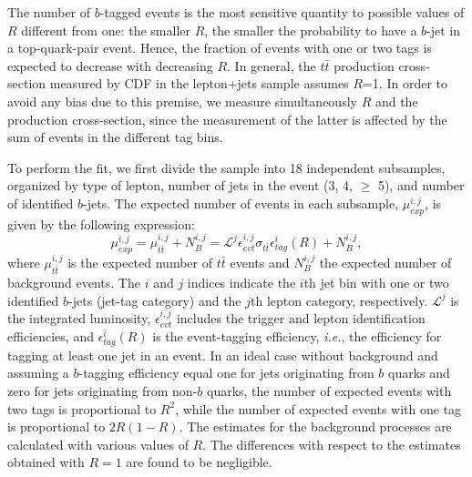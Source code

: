 \documentclass[aps,prd,twocolumn,superscriptaddress,showpacs]{revtex4}
\begin{document}
The number of $b$-tagged events is the most sensitive quantity to possible values of $R$ different from one:
the smaller  $R$, the smaller  the probability to have a
$b$-jet in a top-quark-pair event.
Hence, the fraction of events with one or two tags is expected to decrease with
decreasing $R$.
In general, the $t\bar{t}$ production cross-section measured by CDF in the lepton+jets sample assumes $R$=1. 
In order to avoid any bias due to
this premise, we measure simultaneously $R$ and the production cross-section, since the measurement of the latter is 
affected by the sum of events in the different tag bins.

To perform the fit, we first divide the sample into 18 independent  subsamples, organized by type of lepton,
 number of jets in the event (3, 4, $\ge$ 5), and 
number of identified $b$-jets.
The expected number of  events in each  subsample, $\mu_{exp}^{i,j}$, 
is given by the following expression:
\begin{equation}
\mu_{exp}^{i,j} = \mu_{t\bar t}^{i,j} +N_B^{i,j} = \mathscr{L}^{j} \epsilon_{evt}^{i,j}  \sigma_{t\bar t} 
\epsilon_{tag}^i (R) + N_B^{i,j},
\label{eq:equationttexpected}
\end{equation}
where $\mu_{t\bar t}^{i,j}$ is the expected number of $t\bar t$ events and $N_B^{i,j}$ the expected 
number of background events. The  $i$ and $j$ indices indicate the $i$th jet bin  with one or two identified $b$-jets
(jet-tag category)  and the $j$th lepton category, respectively.  
$\mathscr{L}^{j}$ is the integrated luminosity, 
$\epsilon_{evt}^{i,j}$ includes the trigger and lepton identification efficiencies, and $\epsilon^{i}_{tag}(R)$ is 
the event-tagging efficiency, {\it i.e.}, the efficiency for tagging at least one jet in an event.
In an ideal case without background and assuming a $b$-tagging efficiency equal one for jets originating from $b$ quarks
and zero for
jets originating from non-$b$ quarks, the number of expected events with two  tags is proportional to $R^2$,
while the number of expected events
with one  tag is proportional to $2R(1-R)$.
The estimates for the background processes are calculated with various values of $R$. The differences with 
respect to the estimates obtained with $R=1$ are found to be negligible.

\end{document}
